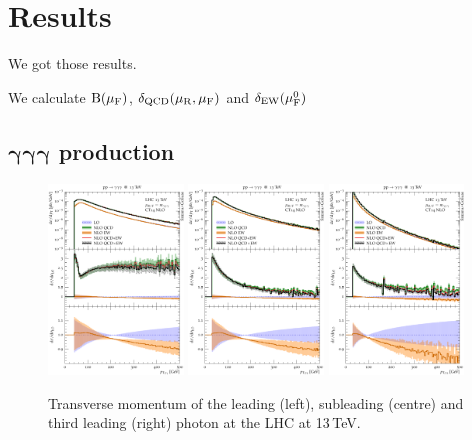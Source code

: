 \section{Results}
\label{sec:results}

We got those results.

We calculate $\mathrm{B}(\mu_{\mathrm{F}})$, $\delta_\text{QCD}(\mu_{\mathrm{R}},\mu_{\mathrm{F}})$ and 
$\delta_\text{EW}(\mu_{\mathrm{F}}^0)$

\subsection{\texorpdfstring{$\boldsymbol{\gamma\gamma\gamma}$}{aaa} production}
\label{sec:results:aaa}

\begin{figure}[t!]
  \centering
  \includegraphics[width=0.32\textwidth]{figs_aaa/pT_y1}
  \includegraphics[width=0.32\textwidth]{figs_aaa/pT_y2}
  \includegraphics[width=0.32\textwidth]{figs_aaa/pT_y3}
  \caption{
    Transverse momentum of the leading (left), subleading (centre) 
    and third leading (right) photon at the LHC at 13\,TeV.
    \label{fig:aaa:pt}
  }
\end{figure}

